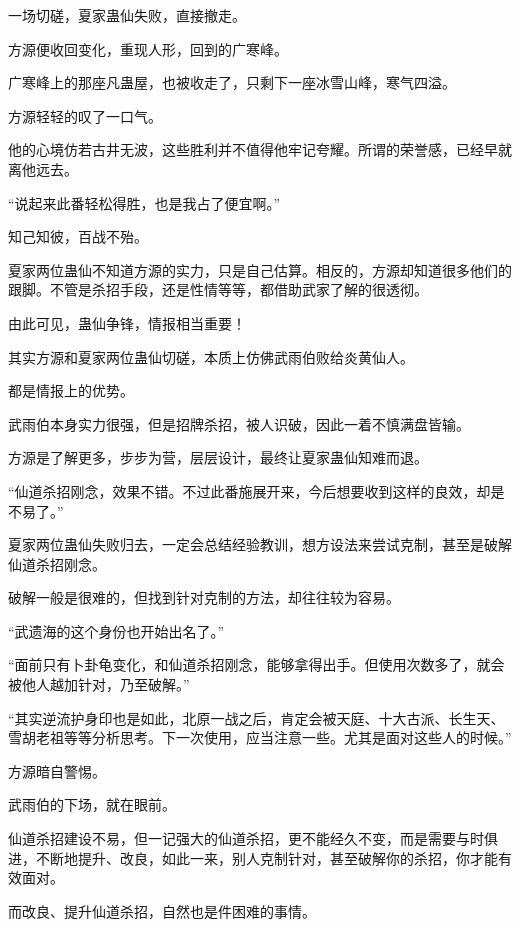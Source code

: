 
\begin{this_body}



一场切磋，夏家蛊仙失败，直接撤走。

方源便收回变化，重现人形，回到的广寒峰。

广寒峰上的那座凡蛊屋，也被收走了，只剩下一座冰雪山峰，寒气四溢。

方源轻轻的叹了一口气。

他的心境仿若古井无波，这些胜利并不值得他牢记夸耀。所谓的荣誉感，已经早就离他远去。

“说起来此番轻松得胜，也是我占了便宜啊。”

知己知彼，百战不殆。

夏家两位蛊仙不知道方源的实力，只是自己估算。相反的，方源却知道很多他们的跟脚。不管是杀招手段，还是性情等等，都借助武家了解的很透彻。

由此可见，蛊仙争锋，情报相当重要！

其实方源和夏家两位蛊仙切磋，本质上仿佛武雨伯败给炎黄仙人。

都是情报上的优势。

武雨伯本身实力很强，但是招牌杀招，被人识破，因此一着不慎满盘皆输。

方源是了解更多，步步为营，层层设计，最终让夏家蛊仙知难而退。

“仙道杀招刚念，效果不错。不过此番施展开来，今后想要收到这样的良效，却是不易了。”

夏家两位蛊仙失败归去，一定会总结经验教训，想方设法来尝试克制，甚至是破解仙道杀招刚念。

破解一般是很难的，但找到针对克制的方法，却往往较为容易。

“武遗海的这个身份也开始出名了。”

“面前只有卜卦龟变化，和仙道杀招刚念，能够拿得出手。但使用次数多了，就会被他人越加针对，乃至破解。”

“其实逆流护身印也是如此，北原一战之后，肯定会被天庭、十大古派、长生天、雪胡老祖等等分析思考。下一次使用，应当注意一些。尤其是面对这些人的时候。”

方源暗自警惕。

武雨伯的下场，就在眼前。

仙道杀招建设不易，但一记强大的仙道杀招，更不能经久不变，而是需要与时俱进，不断地提升、改良，如此一来，别人克制针对，甚至破解你的杀招，你才能有效面对。

而改良、提升仙道杀招，自然也是件困难的事情。


\end{this_body}
